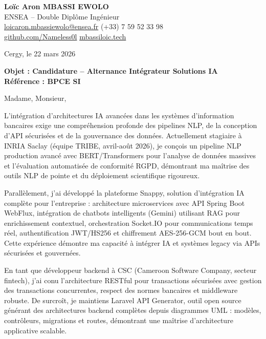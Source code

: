 \documentclass[a4paper,11pt]{article}
\begin{document}
\noindent
\textbf{Lo\"ic Aron MBASSI EWOLO} \\
ENSEA -- Double Dipl\^ome Ing\'enieur \\
\href{mailto:loicaron.mbassiewolo@ensea.fr}{loicaron.mbassiewolo@ensea.fr} \quad (+33) 7 59 52 33 98 \\
\href{https://github.com/Nameless0l}{github.com/Nameless0l} \quad \href{https://mbassiloic.tech}{mbassiloic.tech}

\vspace{1em}
\noindent Cergy, le 22 mars 2026

\vspace{1em}
\noindent
\textbf{Objet : Candidature -- Alternance Int\'egrateur Solutions IA} \\
\textbf{R\'ef\'erence : BPCE SI}

\vspace{1.5em}
\noindent Madame, Monsieur,

L'int\'egration d'architectures IA avanc\'ees dans les syst\`emes d'information bancaires exige une compr\'ehension profonde des pipelines NLP, de la conception d'API s\'ecuris\'ees et de la gouvernance des donn\'ees. Actuellement stagiaire \`a INRIA Saclay (\'equipe TRIBE, avril-ao\^ut 2026), je con\c{c}ois un pipeline NLP production avanc\'e avec BERT/Transformers pour l'analyse de donn\'ees massives et l'\'evaluation automatisée de conformit\'e RGPD, d\'emontrant ma ma\^itrise des outils NLP de pointe et du d\'eploiement scientifique rigoureux.

\vspace{0.8em}

Parallèlement, j'ai d\'evelopp\'e la plateforme Snappy, solution d'int\'egration IA compl\`ete pour l'entreprise : architecture microservices avec API Spring Boot WebFlux, intégration de chatbots intelligents (Gemini) utilisant RAG pour enrichissement contextuel, orchestration Socket.IO pour communications temps r\'eel, authentification JWT/HS256 et chiffrement AES-256-GCM bout en bout. Cette exp\'erience d\'emontre ma capacit\'e \`a int\'egrer IA et syst\`emes legacy via APIs s\'ecuris\'ees et gouvern\'ees.

\vspace{0.8em}

En tant que d\'eveloppeur backend \`a CSC (Cameroon Software Company, secteur fintech), j'ai conu l'architecture RESTful pour transactions s\'ecuris\'ees avec gestion des transactions concurrentes, respect des normes bancaires et middleware robuste. De surcroît, je maintiens Laravel API Generator, outil open source g\'en\'erant des architectures backend compl\`etes depuis diagrammes UML : modèles, contr\^oleurs, migrations et routes, d\'emontrant une ma\^itrise d'architecture applicative scalable.
\end{document}
